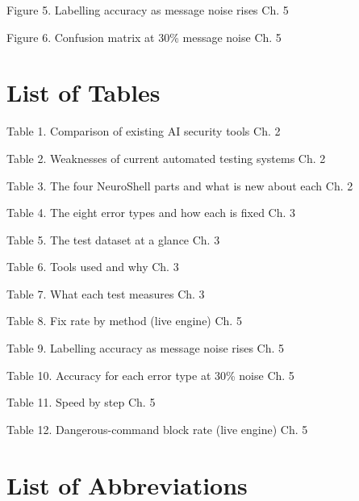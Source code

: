 \documentclass[
]{article}
\begin{document}
Figure 5. Labelling accuracy as message noise rises Ch. 5

Figure 6. Confusion matrix at 30\% message noise Ch. 5

\hypertarget{list-of-tables}{%
\section{List of Tables}\label{list-of-tables}}

Table 1. Comparison of existing AI security tools Ch. 2

Table 2. Weaknesses of current automated testing systems Ch. 2

Table 3. The four NeuroShell parts and what is new about each Ch. 2

Table 4. The eight error types and how each is fixed Ch. 3

Table 5. The test dataset at a glance Ch. 3

Table 6. Tools used and why Ch. 3

Table 7. What each test measures Ch. 3

Table 8. Fix rate by method (live engine) Ch. 5

Table 9. Labelling accuracy as message noise rises Ch. 5

Table 10. Accuracy for each error type at 30\% noise Ch. 5

Table 11. Speed by step Ch. 5

Table 12. Dangerous-command block rate (live engine) Ch. 5

\hypertarget{list-of-abbreviations}{%
\section{List of Abbreviations}\label{list-of-abbreviations}}
\end{document}

